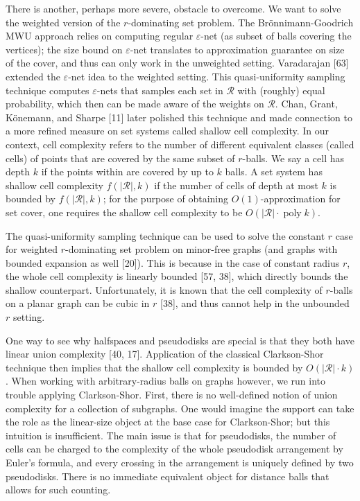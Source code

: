 \documentclass[10pt,a4paper]{article}
\begin{document}
There is another, perhaps more severe, obstacle to overcome. We want to solve the weighted version of the $r$-dominating set problem. The Brönnimann-Goodrich MWU approach relies on computing regular $\varepsilon$-net (as subset of balls covering the vertices); the size bound on $\varepsilon$-net translates to approximation guarantee on size of the cover, and thus can only work in the unweighted setting. Varadarajan [63] extended the $\varepsilon$-net idea to the weighted setting. This quasi-uniformity sampling technique computes $\varepsilon$-nets that samples each set in $\mathcal{R}$ with (roughly) equal probability, which then can be made aware of the weights on $\mathcal{R}$. Chan, Grant, Könemann, and Sharpe [11] later polished this technique and made connection to a more refined measure on set systems called shallow cell complexity. In our context, cell complexity refers to the number of different equivalent classes (called cells) of points that are covered by the same subset of $r$-balls. We say a cell has depth $k$ if the points within are covered by up to $k$ balls. A set system has shallow cell complexity $f(|\mathcal{R}|,k)$ if the number of cells of depth at most $k$ is bounded by $f(|\mathcal{R}|,k)$; for the purpose of obtaining $O(1)$-approximation for set cover, one requires the shallow cell complexity to be $O(|\mathcal{R}|\cdot\operatorname{poly}k)$.
\par
\par
The quasi-uniformity sampling technique can be used to solve the constant $r$ case for weighted $r$-dominating set problem on minor-free graphs (and graphs with bounded expansion as well [20]). This is because in the case of constant radius $r$, the whole cell complexity is linearly bounded [57, 38], which directly bounds the shallow counterpart. Unfortunately, it is known that the cell complexity of $r$-balls on a planar graph can be cubic in $r$ [38], and thus cannot help in the unbounded $r$ setting.
\par
\par
One way to see why halfspaces and pseudodisks are special is that they both have linear union complexity [40, 17]. Application of the classical Clarkson-Shor technique then implies that the shallow cell complexity is bounded by $O(|\mathcal{R}|\cdot k)$. When working with arbitrary-radius balls on graphs however, we run into trouble applying Clarkson-Shor. First, there is no well-defined notion of union complexity for a collection of subgraphs. One would imagine the support can take the role as the linear-size object at the base case for Clarkson-Shor; but this intuition is insufficient. The main issue is that for pseudodisks, the number of cells can be charged to the complexity of the whole pseudodisk arrangement by Euler’s formula, and every crossing in the arrangement is uniquely defined by two pseudodisks. There is no immediate equivalent object for distance balls that allows for such counting.
\end{document}
